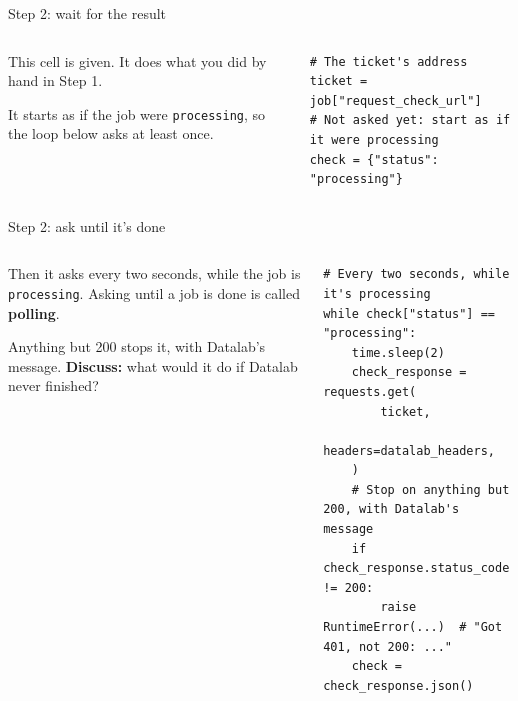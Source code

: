 \documentclass[9pt,aspectratio=169]{beamer}
\begin{document}
\begin{frame}[fragile]{Step 2: wait for the result}
    \begin{columns}[T]
        \begin{column}{0.37\textwidth}
            This cell is given. It does what you did by hand in Step 1.

            \medskip
            It starts as if the job were \texttt{processing}, so the loop below asks at least once.
        \end{column}
        \begin{column}{0.6\textwidth}
\begin{lstlisting}
# The ticket's address
ticket = job["request_check_url"]
# Not asked yet: start as if it were processing
check = {"status": "processing"}
\end{lstlisting}
        \end{column}
    \end{columns}
\end{frame}

\begin{frame}[fragile]{Step 2: ask until it's done}
    \begin{columns}[T]
        \begin{column}{0.37\textwidth}
            Then it asks every two seconds, while the job is \texttt{processing}. Asking until a job is done is called \textbf{polling}.

            \medskip
            Anything but 200 stops it, with Datalab's message. \textbf{Discuss:} what would it do if Datalab never finished?
        \end{column}
        \begin{column}{0.6\textwidth}
\begin{lstlisting}
# Every two seconds, while it's processing
while check["status"] == "processing":
    time.sleep(2)
    check_response = requests.get(
        ticket,
        headers=datalab_headers,
    )
    # Stop on anything but 200, with Datalab's message
    if check_response.status_code != 200:
        raise RuntimeError(...)  # "Got 401, not 200: ..."
    check = check_response.json()
\end{lstlisting}
        \end{column}
    \end{columns}
\end{frame}
\end{document}

